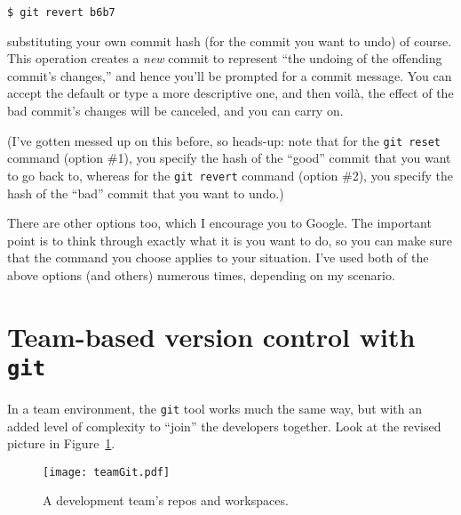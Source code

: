 \begin{itemize}
\vspace{-.1in}
\begin{Verbatim}[fontsize=\small,samepage=true,frame=none]
  $ git revert b6b7
\end{Verbatim}
\vspace{-.1in}

substituting your own commit hash (for the commit you want to undo) of course.
This operation creates a \textit{new} commit to represent ``the undoing of the
offending commit's changes,'' and hence you'll be prompted for a commit
message. You can accept the default or type a more descriptive one, and then
voil\`{a}, the effect of the bad commit's changes will be canceled, and you can
carry on.

\end{itemize}

(I've gotten messed up on this before, so heads-up: note that for the
\texttt{git reset} command (option \#1), you specify the hash of the ``good''
commit that you want to go back to, whereas for the \texttt{git revert} command
(option \#2), you specify the hash of the ``bad'' commit that you want to
undo.)


\bigskip

There are other options too, which I encourage you to Google. The important
point is to think through exactly what it is you want to do, so you can make
sure that the command you choose applies to your situation. I've used both of
the above options (and others) numerous times, depending on my scenario.





\vfill
\pagebreak

\section{Team-based version control with \texttt{git}}

In a team environment, the \texttt{git} tool works much the same way, but with
an added level of complexity to ``join'' the developers together. Look at the
revised picture in Figure~\ref{fig:teamGit}.

\begin{figure}[hb]
\centering
\hspace*{-.1in}
\texttt{[image: teamGit.pdf]}  %
\caption{A development team's repos and workspaces.}
\label{fig:teamGit}
\end{figure}

